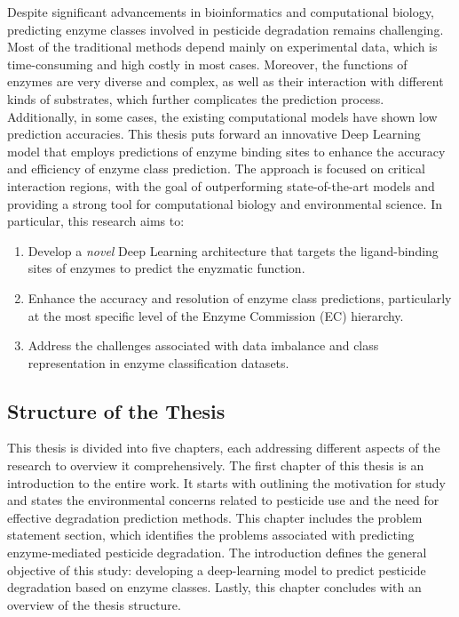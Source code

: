Despite significant advancements in bioinformatics and computational biology, predicting enzyme classes involved in pesticide degradation remains challenging. Most of the traditional methods depend mainly on experimental data, which is time-consuming and high costly in most cases. Moreover, the functions of enzymes are very diverse and complex, as well as their interaction with different kinds of substrates, which further complicates the prediction process. Additionally, in some cases, the existing computational models have shown low prediction accuracies. This thesis puts forward an innovative Deep Learning model that employs predictions of enzyme binding sites to enhance the accuracy and efficiency of enzyme class prediction. The approach is focused on critical interaction regions, with the goal of outperforming state-of-the-art models and providing a strong tool for computational biology and environmental science. In particular, this research aims to:

\begin{enumerate}[label=(\alph*)]
    \item Develop a \textit{novel} Deep Learning architecture that targets the ligand-binding sites of enzymes to predict the enyzmatic function.
    \item Enhance the accuracy and resolution of enzyme class predictions, particularly at the most specific level of the Enzyme Commission (EC) hierarchy.
    \item Address the challenges associated with data imbalance and class representation in enzyme classification datasets.
\end{enumerate}

\subsection{Structure of the Thesis}
\label{sec:Structure of the Thesis}

This thesis is divided into five chapters, each addressing different aspects of the research to overview it comprehensively. The first chapter of this thesis is an introduction to the entire work. It starts with outlining the motivation for study and states the environmental concerns related to pesticide use and the need for effective degradation prediction methods. This chapter includes the problem statement section, which identifies the problems associated with predicting enzyme-mediated pesticide degradation. The introduction defines the general objective of this study: developing a deep-learning model to predict pesticide degradation based on enzyme classes. Lastly, this chapter concludes with an overview of the thesis structure.

